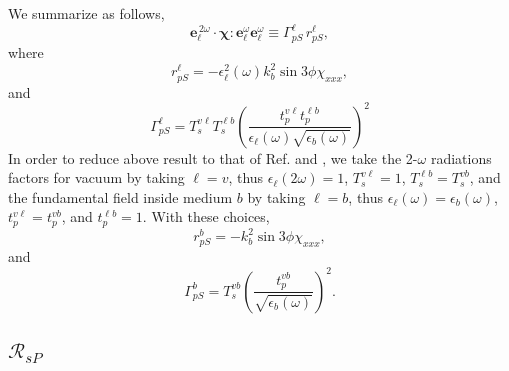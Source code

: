 We summarize as follows,
\begin{equation*}
\mathbf{e}^{\,2\omega}_{\ell}\cdot
\boldsymbol{\chi}:\mathbf{e}^\omega_{\ell}\mathbf{e}^\omega_{\ell}
\equiv\Gamma^{\ell}_{pS}\, r^{\ell}_{pS},
\end{equation*}
where
\begin{equation*}
r^{\ell}_{pS}
= -\epsilon^{2}_{\ell}(\omega)k^{2}_{b}\sin3\phi\chi_{xxx},
\end{equation*} 
and  
\begin{equation*}
\Gamma^{\ell}_{pS} =
T^{v\ell}_{s}T^{\ell b}_{s}\left(\frac{t^{v\ell}_{p}t^{\ell b}_{p}}
      {\epsilon_{\ell}(\omega)\sqrt{\epsilon_{b}(\omega)}}\right)^{2}
\end{equation*} 
In order to reduce above result to that of Ref. \cite{mizrahiJOSA88} and
\cite{sipePRB87},  we take the 2-$\omega$ radiations factors for vacuum by
taking $\ell=v$, thus $\epsilon_{\ell}(2\omega)=1$, $T^{v\ell}_{s}=1$,
$T^{\ell b}_{s}=T^{vb}_{s}$, and the fundamental field inside medium $b$ by
taking $\ell=b$, thus $\epsilon_{\ell}(\omega)=\epsilon_{b}(\omega)$,
$t^{v\ell}_{p}=t^{vb}_{p}$, and $t^{\ell b}_{p}=1$. With these choices,
\begin{equation*}
r^{b}_{pS} = -k^{2}_{b}\sin3\phi\chi_{xxx},
\end{equation*} 
and 
\begin{equation*}
\Gamma^{b}_{pS} =
T^{vb}_{s}
\left(
\frac{t^{vb}_{p}}{\sqrt{\epsilon_{b}(\omega)}}
\right)^{2}.  
\end{equation*} 


\subsection{\texorpdfstring{$\mathcal{R}_{sP}$}{RsP}}

